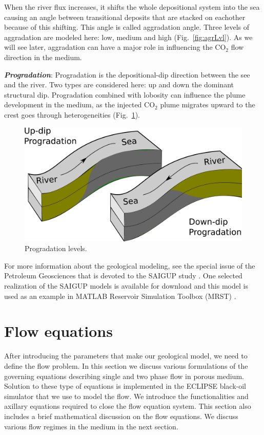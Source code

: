 When the river flux increases, it shifts the whole depositional system into the
sea causing an  angle between transitional deposits that are stacked on
eachother because of this shifting. This angle is called aggradation angle.
Three levels of aggradation are modeled here: low, medium and
high (Fig.~\ref{fig:agrLvl}). As we will see later, aggradation can have a major
role in influencing the $\mbox{CO}_2$ flow direction in the medium. 

\textbf{\textit{Progradation}}: 
Progradation is the depositional-dip direction between the see and the river.
Two types are considered here: up and down the dominant structural dip.
Progradation combined with lobosity can influence the plume development in the
medium, as the injected $\mbox{CO}_2$ plume migrates upward to the crest goes
through heterogeneities (Fig.~\ref{fig:proLvl}).


\begin{figure}[thb]
  \centering
  \includegraphics[width=0.65 \linewidth]{./figurer/progradation} 
  \caption{Progradation levels.}
  \label{fig:proLvl}
%
\end{figure}

\vspace{1cm}
For more information about the geological modeling, see the special issue of the Petroleum Geosciences that is devoted to the SAIGUP study \cite{matthews2008assessing}. One selected realization of the SAIGUP models is available for download \cite{saigupModel} and this model is used as an example in MATLAB Reservoir Simulation Toolbox (MRST) \cite{mrstSaigup}. 

\section{Flow equations}
\label{sec:FlowEquations}
After introducing the parameters that make our geological model, we need to
define the flow problem. In this section we discuss various formulations of the governing equations describing single and two phase flow in porous medium. Solution to these type of equations is implemented in the ECLIPSE black-oil simulator that we use to model the flow. We introduce the functionalities and axillary equations required to close the flow equation system. This section also includes a brief mathematical discussion on the flow equations. We discuss various flow regimes in the medium in the next section.

